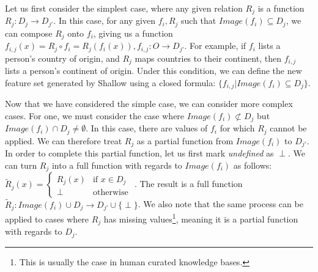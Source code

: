 \documentclass[twoside,11pt]{article}
\theoremstyle{definition}
\begin{document}
Let us first consider the simplest case, where any given relation $R_j$ is a function $R_j:D_j\rightarrow D_{j'}$. In this case, for any given $f_i,R_j$ such that 
$Image(f_i) \subseteq D_j$, we can compose $R_j$ onto $f_i$, giving us a function $f_{i,j}(x)=R_j\circ f_i=R_j(f_i(x)),f_{i,j}:O\rightarrow D_{j'}$. For example, if $f_i$ lists a person's country of origin, and $R_j$ maps countries to their continent, then $f_{i,j}$ lists a person's continent of origin.
Under this condition, we can define the new feature set generated by Shallow using a closed formula: $\{f_{i,j}|Image(f_i) \subseteq D_j\}$.

Now that we have considered the simple case, we can consider more complex cases.
For one, we must consider the case where $Image(f_i) \not\subset D_j$ but $Image(f_i) \cap D_j \neq\emptyset$. In this case, there are values of $f_i$ for which $R_j$ cannot be applied. We can therefore treat $R_j$ as a partial function from $Image(f_i)$ to $D_{j'}$. In order to complete this partial function, let us first mark \emph{undefined} as $\perp$. We can turn $R_j$ into a full function with regards to $Image(f_i)$ as follows: $\tilde{R}_j(x)=\begin{cases} R_j(x) &\mbox{if } x\in D_j\\ 
\perp & \mbox{otherwise } \end{cases}$.
The result is a full function $\tilde{R}_j:Image(f_i)\cup D_j\rightarrow D_{j'}\cup\{\perp\}$. We also note that the same process can be applied to cases where $R_j$ has missing values\footnote{This is usually the case in human curated knowledge bases.}, meaning it is a partial function with regards to $D_j$. 
\end{document}
